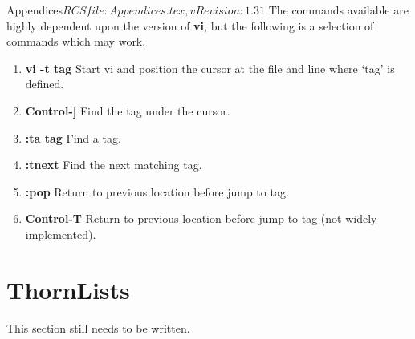 \begin{cactuspart}{6}{Appendices}{$RCSfile: Appendices.tex,v $}{$Revision: 1.31 $}
The commands available are highly dependent upon the version of {\bf vi}, but
the following is a selection of commands which may work.


\begin{enumerate}

\item \textbf{vi -t tag}
Start vi and position the cursor at  the  file and line where `tag' is defined.

\item \textbf{Control-]}
Find the tag under the cursor.

\item \textbf{:ta tag}
Find a tag.

\item \textbf{:tnext}
Find the next matching tag.

\item \textbf{:pop}
Return to previous location before jump to tag.

\item \textbf{Control-T}
Return to previous location before jump to tag (not widely implemented).

\end{enumerate}


\chapter{ThornLists}

\label{chap:th}

This section still needs to be written.



\end{cactuspart}
